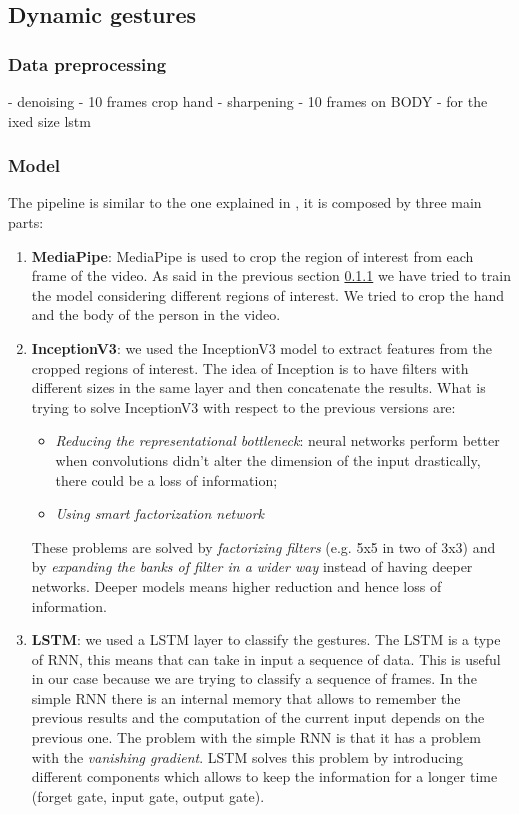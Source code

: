 \documentclass[10pt,twocolumn,letterpaper]{article}
\begin{document}
\subsection{Dynamic gestures}
\subsubsection{Data preprocessing}
\label{subsec:datapreprocessing}
- denoising
- 10 frames crop hand
- sharpening
- 10 frames on BODY
- for the ixed size lstm
\subsubsection{Model}
The pipeline is similar to the one explained in \cite{electronics13163233}, it is composed by three main parts:
\begin{enumerate}
   \item \textbf{MediaPipe}: MediaPipe is used to crop the region of interest from each frame of the video.
   As said in the previous section \ref{subsec:datapreprocessing} we have tried to train the model considering 
   different regions of interest. We tried to crop the hand and the body of the person in the video.
   \item \textbf{InceptionV3}: we used the InceptionV3 model \cite{szegedy2015rethinkinginceptionarchitecturecomputer} 
   to extract features from the cropped regions of interest.
   The idea of Inception is to have filters with different sizes in the same layer and then concatenate 
   the results. What is trying to solve InceptionV3 with respect to the previous versions are:
   \begin{itemize}
      \item \textit{Reducing the representational bottleneck}: neural networks perform better when convolutions
      didn't alter the dimension of the input drastically, there could be a loss of information;
      \item \textit{Using smart factorization network}
   \end{itemize}  
   These problems are solved by \textit{factorizing filters} (e.g. 5x5 in two of 3x3) and by \textit{expanding 
   the banks of filter in a wider way} instead of having deeper networks. 
   Deeper models means higher reduction and hence loss of information.
   \item \textbf{LSTM}: we used a LSTM layer to classify the gestures. 
   The LSTM is a type of RNN, this means that can take in input a sequence of data. This is useful in our case
   because we are trying to classify a sequence of frames. In the simple RNN there is an internal memory 
   that allows to remember the previous results and the computation of the current input depends on 
   the previous one. The problem with the simple RNN is that it has a problem with the \textit{vanishing gradient}.
   LSTM solves this problem by introducing different components which allows to keep the information 
   for a longer time (forget gate, input gate, output gate).
\end{enumerate}
\end{document}
